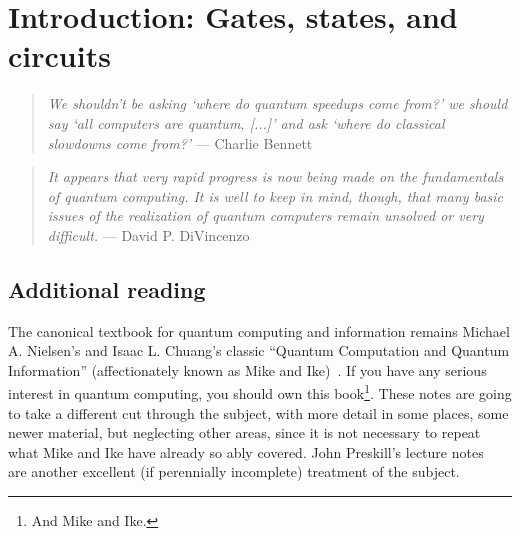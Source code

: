 

\clearpage


\clearpage
\section{Introduction: Gates, states, and circuits}


\begin{quote}
\emph{We shouldn't be asking `where do quantum speedups come from?' we should say `all computers are quantum, [...]' and ask `where do classical slowdowns come from?'} --- Charlie Bennett~\cite{???}
\end{quote}


\begin{quote}
\emph{It appears that very rapid progress is now being made on the fundamentals of quantum computing. It is well to keep in mind, though, that many basic issues of the realization of quantum computers remain unsolved or very difficult.} --- David P. DiVincenzo ~\cite{DiVincenzo1995a}
\end{quote}

%
%
%
%
%
%
%

\subsection{Additional reading}
The canonical textbook for quantum computing and information remains Michael A. Nielsen's and Isaac L. Chuang's   
classic ``Quantum Computation and Quantum Information'' (affectionately known as Mike and Ike)~\cite{Nielsen2000a}.  
If you have any serious interest in quantum computing, you should own this book\footnote{And Mike and Ike.}.
These notes are 
going to take a different cut through the subject, with more detail in some places, some newer material, but neglecting other areas, since it is not necessary to repeat what Mike and Ike have already so ably covered. John Preskill's lecture notes~\cite{PreskillLectureNotes} are another excellent (if perennially incomplete) treatment of the subject.

